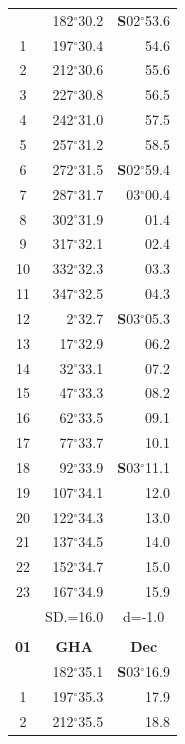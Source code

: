 \documentclass[10pt, a4paper]{report}
\begin{document}
\begin{scriptsize}
\begin{tabular*}{0.2\textwidth}[t]{@{\extracolsep{\fill}}|c|rr|}
\hline\rule{0pt}{2.6ex}\noindent
0 & 182$^\circ$30.2 & \textbf{S}02$^\circ$53.6\\
1 & 197$^\circ$30.4 & 54.6\\
2 & 212$^\circ$30.6 & 55.6\\
3 & 227$^\circ$30.8 & \raisebox{0.24ex}{\boldmath$\cdot$~\boldmath$\cdot$~~}56.5\\
4 & 242$^\circ$31.0 & 57.5\\
5 & 257$^\circ$31.2 & 58.5\\[2Pt]
6 & 272$^\circ$31.5 & \textbf{S}02$^\circ$59.4\\
7 & 287$^\circ$31.7 & 03$^\circ$00.4\\
8 & 302$^\circ$31.9 & 01.4\\
9 & 317$^\circ$32.1 & \raisebox{0.24ex}{\boldmath$\cdot$~\boldmath$\cdot$~~}02.4\\
10 & 332$^\circ$32.3 & 03.3\\
11 & 347$^\circ$32.5 & 04.3\\[2Pt]
12 & 2$^\circ$32.7 & \textbf{S}03$^\circ$05.3\\
13 & 17$^\circ$32.9 & 06.2\\
14 & 32$^\circ$33.1 & 07.2\\
15 & 47$^\circ$33.3 & \raisebox{0.24ex}{\boldmath$\cdot$~\boldmath$\cdot$~~}08.2\\
16 & 62$^\circ$33.5 & 09.1\\
17 & 77$^\circ$33.7 & 10.1\\[2Pt]
18 & 92$^\circ$33.9 & \textbf{S}03$^\circ$11.1\\
19 & 107$^\circ$34.1 & 12.0\\
20 & 122$^\circ$34.3 & 13.0\\
21 & 137$^\circ$34.5 & \raisebox{0.24ex}{\boldmath$\cdot$~\boldmath$\cdot$~~}14.0\\
22 & 152$^\circ$34.7 & 15.0\\
23 & 167$^\circ$34.9 & 15.9\\
\hline
\rule{0pt}{2.4ex} & \multicolumn{1}{c}{SD.=16.0} & \multicolumn{1}{c|}{d=-1.0}\\
\hline
\multicolumn{1}{c}{}\\[-0.5ex]\hline
\multicolumn{1}{|c|}{\rule{0pt}{2.6ex}\textbf{01}} & \multicolumn{1}{c}{\textbf{GHA}} & \multicolumn{1}{c|}{\textbf{Dec}}\\
\hline\rule{0pt}{2.6ex}\noindent
0 & 182$^\circ$35.1 & \textbf{S}03$^\circ$16.9\\
1 & 197$^\circ$35.3 & 17.9\\
2 & 212$^\circ$35.5 & 18.8\\

\end{tabular*}
\end{scriptsize}
\end{document}
